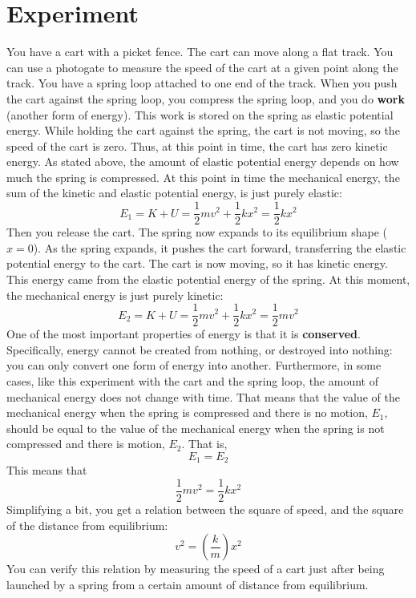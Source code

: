 \section{Experiment}
%
You have a cart with a picket fence. The cart can move along a flat track. You can use a photogate to measure the speed of the cart at a given point along the track. You have a spring loop attached to one end of the track. When you push the cart against the spring loop, you compress the spring loop, and you do \textbf{work} (another form of energy). This work is stored on the spring as elastic potential energy. While holding the cart against the spring, the cart is not moving, so the speed of the cart is zero. Thus, at this point in time, the cart has zero kinetic energy. As stated above, the amount of elastic potential energy depends on how much the spring is compressed. At this point in time the mechanical energy, the sum of the kinetic and elastic potential energy, is just purely elastic:
\begin{equation}
    E_{1} = K + U = \frac{1}{2} m v^{2} + \frac{1}{2} k x^{2} = \frac{1}{2} k x^{2}
\end{equation}
Then you release the cart. The spring now expands to its equilibrium shape ($x = 0$). As the spring expands, it pushes the cart forward, transferring the elastic potential energy to the cart. The cart is now moving, so it has kinetic energy. This energy came from the elastic potential energy of the spring. At this moment, the mechanical energy is just purely kinetic:
\begin{equation}
    E_{2} = K + U = \frac{1}{2} m v^{2} + \frac{1}{2} k x^{2} = \frac{1}{2} m v^{2}
\end{equation}
One of the most important properties of energy is that it is \textbf{conserved}. Specifically, energy cannot be created from nothing, or destroyed into nothing: you can only convert one form of energy into another. Furthermore, in some cases, like this experiment with the cart and the spring loop, the amount of mechanical energy does not change with time. That means that the value of the mechanical energy when the spring is compressed and there is no motion, $E_{1}$, should be equal to the value of the mechanical energy when the spring is not compressed and there is motion, $E_{2}$. That is,
\begin{equation}
    E_{1} = E_{2}
\end{equation}
This means that
\begin{equation}
    \frac{1}{2} m v^{2} = \frac{1}{2} k x^{2}
\end{equation}
Simplifying a bit, you get a relation between the square of speed, and the square of the distance from equilibrium:
\begin{equation}
    v^{2} = \left( \frac{k}{m} \right) x^{2}
\end{equation}
You can verify this relation by measuring the speed of a cart just after being launched by a spring from a certain amount of distance from equilibrium.

